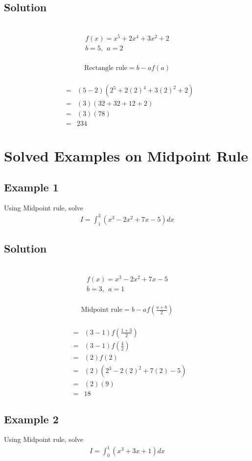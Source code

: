 \documentclass[12pt]{report}
\newcommand{\sps}{\\[0.2cm]}
\begin{document}
	\subsection*{Solution}
	{~}\\[-2.1cm]
	\begin{gather*}
		f(x) = x^5 + 2x^4 + 3x^2 + 2\sps
		b=5,~~ a = 2
	\end{gather*}
	{~}\\[-2.1cm]
	\begin{gather*}
		\text{Rectangle rule} = b-af(a)
	\end{gather*}
	{~}\\[-2.1cm]
	\begin{eqnarray*}
		&=&(5-2)(2^5 + 2(2)^4 + 3 (2)^2 + 2)\sps
		&=&(3)(32+32+12+2)\sps
		&=&(3)(78)\sps
		&=&234
	\end{eqnarray*}
	
	\section{Solved Examples on Midpoint Rule}
	\subsection{Example 1}
	Using Midpoint rule, solve
	\begin{eqnarray*}
		I = \int_1^3\left(x^3 - 2x^2 + 7x - 5\right)dx
	\end{eqnarray*}
	
	\subsection*{Solution}
	{~}\\[-2.1cm]
	\begin{gather*}
		f(x) = x^3 - 2x^2 + 7x - 5\sps
		b=3,~~ a=1
	\end{gather*}
	{~}\\[-2.1cm]
	\begin{gather*}
		\text{Midpoint rule} = b-af\left(\frac{a+b}{2}\right)
	\end{gather*}
	{~}\\[-2.1cm]
	\begin{eqnarray*}
		&=&(3-1)f\left(\frac{1+3}{2}\right)\sps
		&=&(3-1)f\left(\frac{4}{2}\right)\sps
		&=&(2)f(2)\sps
		&=&(2)(2^3-2(2)^2 + 7(2)-5)\sps
		&=&(2)(9)\sps
		&=&18
	\end{eqnarray*}
	
	\subsection{Example 2}
	Using Midpoint rule, solve
	\begin{eqnarray*}
		I = \int_0^1\left(x^3 + 3x + 1\right)dx
	\end{eqnarray*}
	
\end{document}
